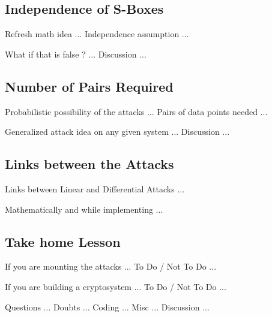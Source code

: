 \documentclass[9pt]{beamer}
\begin{document}
\subsection{Independence of S-Boxes}
\begin{frame}
Refresh math idea ... Independence assumption ... 

\end{frame}

\begin{frame}
What if that is false ? ... Discussion ...

\end{frame}

\subsection{Number of Pairs Required}
\begin{frame}
Probabilistic possibility of the attacks ... Pairs of data points needed ... 

\end{frame}

\begin{frame}
Generalized attack idea on any given system ... Discussion ...

\end{frame}

\subsection{Links between the Attacks}
\begin{frame}
Links between Linear and Differential Attacks ... 

\end{frame}

\begin{frame}
Mathematically and while implementing ...

\end{frame}

\subsection{Take home Lesson}
\begin{frame}
If you are mounting the attacks ... To Do / Not To Do ...

\end{frame}

\begin{frame}
If you are building a cryptosystem ... To Do / Not To Do ...

\end{frame}

\begin{frame}
Questions ... Doubts ... Coding ... Misc ... Discussion ...

\end{frame}
\end{document}
